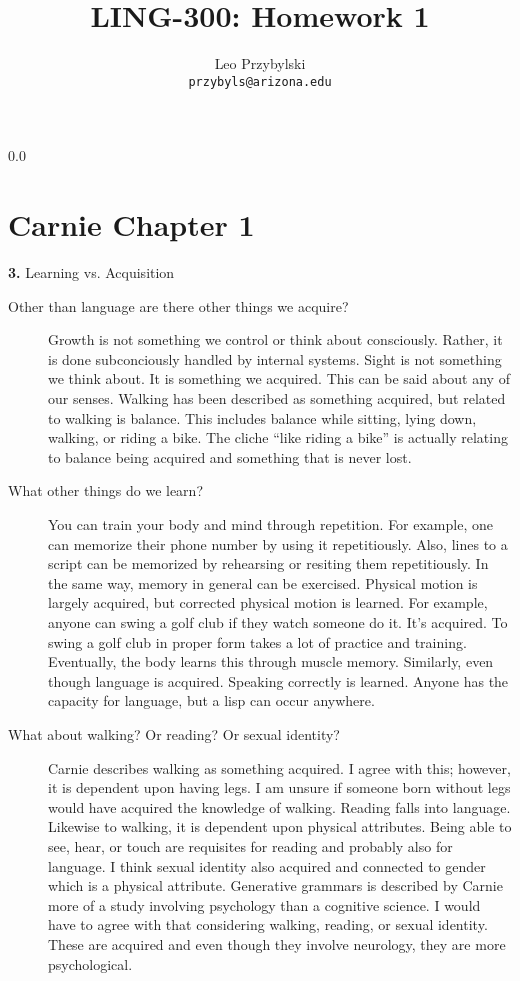 \documentclass[11pt,notitlepage]{article}
\title{LING-300: Homework 1}
\author{Leo Przybylski\\
\texttt{przybyls@arizona.edu}}
\newcommand{\question}[2]{\textbf{#1.} #2}
\begin{document}
  \maketitle
  {\setlength{\baselineskip}%
           {0.0\baselineskip}
  \section*{Carnie Chapter 1}
  \hrulefill \par}

\question{3}{Learning vs. Acquisition}

\begin{description}
\item[Other than language are there other things we acquire?]
  Growth is not something we control or think about
  consciously. Rather, it is done subconciously handled by internal
  systems. Sight is not something we think about. It is something we
  acquired. This can be said about any of our senses. Walking has been
  described as something acquired, but related to walking is
  balance. This includes balance while sitting, lying down, walking,
  or riding a bike. The cliche ``like riding a bike'' is actually relating to
  balance being acquired and something that is never lost.

\item[What other things do we learn?] You can train your body and mind
  through repetition. For example, one can memorize their phone number
  by using it repetitiously. Also, lines to a script can be memorized
  by rehearsing or resiting them repetitiously. In the same way,
  memory in general can be exercised. Physical motion is largely
  acquired, but corrected physical motion is learned. For example,
  anyone can swing a golf club if they watch someone do it. It's
  acquired. To swing a golf club in proper form takes a lot of
  practice and training. Eventually, the body learns this through
  muscle memory. Similarly, even though language is acquired. Speaking
  correctly is learned. Anyone has the capacity for language, but a
  lisp can occur anywhere.

\item[What about walking? Or reading? Or sexual identity?] Carnie
 describes walking as something acquired. I agree with this; however,
 it is dependent upon having legs. I am unsure if someone born without
 legs would have acquired the knowledge of walking. Reading falls into
 language. Likewise to walking, it is dependent upon physical
 attributes. Being able to see, hear, or touch are requisites for
 reading and probably also for language. I think sexual identity also
 acquired and connected to gender which is a physical
 attribute. Generative grammars is described by Carnie more of a study
 involving psychology than a cognitive science. I would have to agree
 with that considering walking, reading, or sexual identity. These are
 acquired and even though they involve neurology, they are more
 psychological.
  
\end{description}
\end{document}

